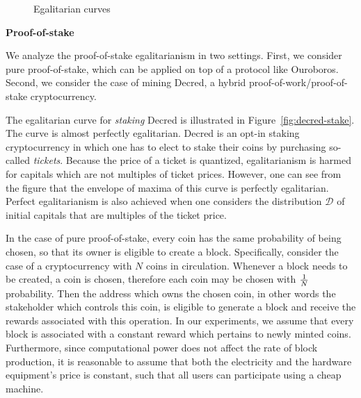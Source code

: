 

\begin{figure}[ht]
  \caption{Egalitarian curves}
  \label{fig:egalitarian_curves}
\end{figure}

\noindent\textbf{Proof-of-stake}

\noindent
We analyze the proof-of-stake egalitarianism in two settings. First, we
consider pure proof-of-stake, which can be applied on top of a protocol like
Ouroboros. Second, we consider the case of mining Decred, a hybrid
proof-of-work/proof-of-stake cryptocurrency.

The egalitarian curve for \emph{staking} Decred is illustrated in
Figure~\ref{fig:decred-stake}. The curve is almost perfectly egalitarian. Decred
is an opt-in staking cryptocurrency in which one has to elect to stake their
coins by purchasing so-called \emph{tickets}. Because the price of a ticket is
quantized, egalitarianism is harmed for capitals which are not multiples of
ticket prices. However, one can see from the figure that the envelope of maxima
of this curve is perfectly egalitarian. Perfect egalitarianism is also achieved
when one considers the distribution $\mathcal{D}$ of initial capitals that are
multiples of the ticket price.


In the case of pure proof-of-stake, every coin has the same probability of being chosen, so that its owner is eligible to create a block. Specifically, consider the case of a cryptocurrency with $N$ coins in circulation. Whenever a block needs to be created, a coin is chosen, therefore each coin may be chosen with $1 \over N$ probability. Then the address which owns the chosen coin, in other words the stakeholder which controls this coin, is eligible to generate a block and receive the rewards associated with this operation. In our experiments, we assume that every block is associated with a constant reward which pertains to newly minted coins. Furthermore, since computational power does not affect the rate of block production, it is reasonable to assume that both the electricity and the hardware equipment's price is constant, such that all users can participate using a cheap machine.

